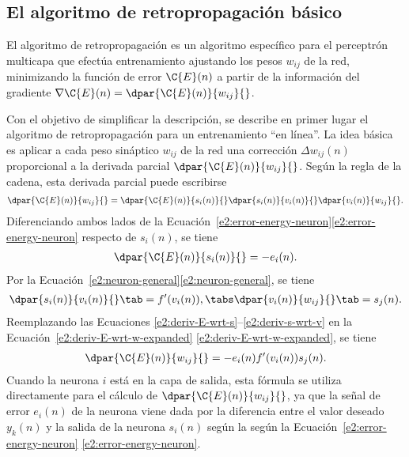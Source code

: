 %
%
\subsection{El algoritmo de retropropagación básico}
%
El algoritmo de retropropagación es un algoritmo específico para el
perceptrón multicapa que efectúa entrenamiento ajustando los pesos
$w_{ij}$ de la red, minimizando la función de error
$\C{E}(n)$ a partir de la información del gradiente
$\nabla\C{E}(n)=\dpar{\C{E}(n)}{w_{ij}}{}$.

Con el objetivo de simplificar la descripción, se describe en primer
lugar el algoritmo de retropropagación para un entrenamiento ``en
línea''.
La idea básica es aplicar a cada peso sináptico $w_{ij}$ de la red una
corrección $\Delta{}w_{ij}(n)$ proporcional a la derivada parcial
$\dpar{\C{E}(n)}{w_{ij}}{}$.
Según la regla de la cadena, esta derivada parcial puede escribirse
%
\begin{align}\label{e2:deriv-E-wrt-w-expanded}
  \dpar{\C{E}(n)}{w_{ij}}{} = \dpar{\C{E}(n)}{s_i(n)}{}
  \dpar{s_i(n)}{v_i(n)}{} \dpar{v_i(n)}{w_{ij}}{}.
\end{align}
%
Diferenciando ambos lados de la
\iflatexml{}Ecuación~\ref{e2:error-energy-neuron}\else\autoref{e2:error-energy-neuron}\fi{}
respecto de $s_i(n)$, se tiene
%
\begin{align}\label{e2:deriv-E-wrt-s}
  \dpar{\C{E}(n)}{s_i(n)}{} = -e_i(n).
\end{align}
%
Por la \iflatexml{}Ecuación~\ref{e2:neuron-general}\else\autoref{e2:neuron-general}\fi, se tiene
%
\begin{align}\label{e2:deriv-s-wrt-v}
  \dpar{s_i(n)}{v_i(n)}{} \tab = f'(v_i(n)),\tabs
  \dpar{v_i(n)}{w_{ij}}{} \tab = s_j(n).
\end{align}
%
Reemplazando las Ecuaciones
\ref{e2:deriv-E-wrt-s}--\ref{e2:deriv-s-wrt-v} en la
\iflatexml{}Ecuación~\ref{e2:deriv-E-wrt-w-expanded}
\else\autoref{e2:deriv-E-wrt-w-expanded}\fi, se tiene
%
\begin{align}\label{e2:deriv-E-wrt-w}
  \dpar{\C{E}(n)}{w_{ij}}{} = -e_i(n) f'(v_i(n)) s_j(n).
\end{align}
%
Cuando la neurona $i$ está en la capa de salida, esta fórmula se
utiliza directamente para el cálculo de $\dpar{\C{E}(n)}{w_{ij}}{}$,
ya que la señal de error $e_i(n)$ de la neurona viene dada por la
diferencia entre el valor deseado $y_k(n)$ y la salida de la neurona
$s_i(n)$ según la según la
\iflatexml{}Ecuación~\ref{e2:error-energy-neuron}
\else\autoref{e2:error-energy-neuron}\fi.

